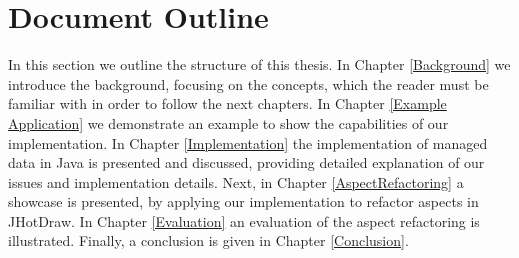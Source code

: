 \section{Document Outline}\label{Document Outline}
In this section we outline the structure of this thesis. 
In Chapter \ref{Background} we introduce the background, focusing on the concepts, which the reader must be familiar with in order to follow the next chapters.
In Chapter \ref{Example Application} we demonstrate an example to show the capabilities of our implementation.
In Chapter \ref{Implementation} the implementation of managed data in Java is presented and discussed, providing detailed explanation of our issues and implementation details.
Next, in Chapter \ref{AspectRefactoring} a showcase is presented, by applying our implementation to refactor aspects in JHotDraw.
In Chapter \ref{Evaluation} an evaluation of the aspect refactoring is illustrated.
Finally, a conclusion is given in Chapter \ref{Conclusion}. 

